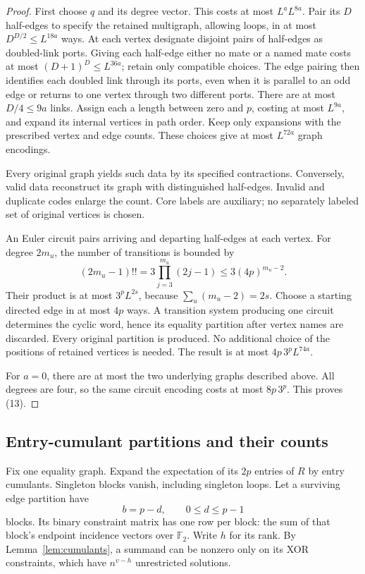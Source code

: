 \documentclass[11pt]{article}
\theoremstyle{definition}
\newcommand{\F}{\mathbb F}
\begin{document}
\begin{proof}
First choose \(q\) and its degree vector. This costs at most
\(L^aL^{8a}\). Pair its \(D\) half-edges to specify the retained
multigraph, allowing loops, in at most \(D^{D/2}\le L^{18a}\)
ways. At each vertex designate disjoint pairs of half-edges as
doubled-link ports. Giving each half-edge either no mate or a named
mate costs at most \((D+1)^D\le L^{36a}\); retain only compatible
choices. The edge pairing then identifies each doubled link through
its ports, even when it is parallel to an odd edge or returns to one
vertex through two different ports. There are at most \(D/4\le9a\)
links. Assign each a length between zero and \(p\), costing at most
\(L^{9a}\), and expand its internal vertices in path order.
Keep only expansions with the prescribed vertex and edge counts.
These choices give at most \(L^{72a}\) graph encodings.

Every original graph yields such data by its specified contractions.
Conversely, valid data reconstruct its graph with distinguished
half-edges. Invalid and duplicate codes enlarge the count. Core
labels are auxiliary; no separately labeled set of original vertices
is chosen.

An Euler circuit pairs arriving and departing half-edges at each
vertex. For degree \(2m_u\), the number of transitions is bounded by
\[
 (2m_u-1)!!=3\prod_{j=3}^{m_u}(2j-1)
                                  \le3(4p)^{m_u-2}.
\]
Their product is at most \(3^p L^{2s}\), because
\(\sum_u(m_u-2)=2s\). Choose a starting directed edge in at most
\(4p\) ways. A transition system producing one circuit determines
the cyclic word, hence its equality partition after vertex names
are discarded. Every original partition is produced. No additional
choice of the positions of retained vertices is needed.
The result is at most \(4p\,3^p L^{74a}\).

For \(a=0\), there are at most the two underlying graphs described
above. All degrees are four, so the same circuit encoding costs
at most \(8p\,3^p\). This proves (13).
\end{proof}

\subsection{Entry-cumulant partitions and their counts}

Fix one equality graph. Expand the expectation of its \(2p\) entries
of \(R\) by entry cumulants. Singleton blocks vanish, including
singleton loops. Let a surviving edge partition have
\[
                         b=p-d,\qquad 0\le d\le p-1
\]
blocks. Its binary constraint matrix has one row per block: the
sum of that block's endpoint incidence vectors over \(\F_2\).
Write \(h\) for its rank. By Lemma~\ref{lem:cumulants}, a summand
can be nonzero only on its XOR constraints, which have
\(n^{v-h}\) unrestricted solutions.
\end{document}

